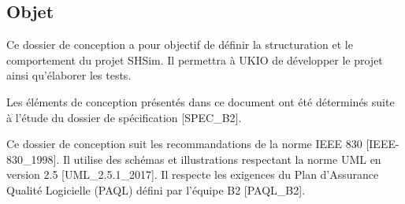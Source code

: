 \subsection{Objet} %

Ce dossier de conception a pour objectif de définir la structuration et le comportement du
projet \gls{SHSim}. Il permettra à UKIO de développer le projet ainsi qu’élaborer les tests. \newline

Les éléments de conception présentés dans ce document ont été déterminés suite à l’étude du
dossier de spécification [SPEC\_B2]. \newline

Ce dossier de conception suit les recommandations de la norme IEEE 830 [IEEE-830\_1998]. Il
utilise des schémas et illustrations respectant la norme UML en version 2.5 [UML\_2.5.1\_2017].
Il respecte les exigences du Plan d’Assurance Qualité Logicielle (PAQL) défini par l’équipe B2
[PAQL\_B2].